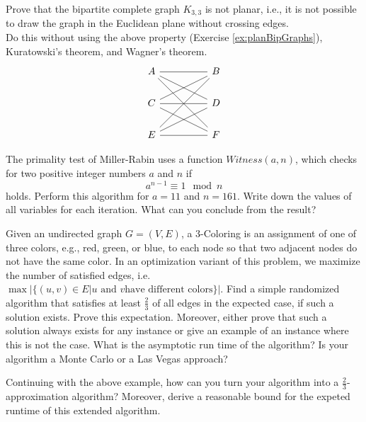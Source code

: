 \documentclass{article}
\begin{document}
\begin{exercise}
    Prove that the bipartite complete graph $K_{3,3}$ is not planar, i.e., it is not possible to draw the graph in the Euclidean plane without crossing edges.\\
    Do this without using the above property (Exercise \ref{ex:planBipGraphs}), Kuratowski's theorem, and Wagner's theorem.
    \[\begin{tikzcd}
	A && B \\
	C && D \\
	E && F
	\arrow[no head, from=1-1, to=1-3]
	\arrow[no head, from=2-3, to=1-1]
	\arrow[no head, from=1-1, to=3-3]
	\arrow[no head, from=1-3, to=2-1]
	\arrow[no head, from=1-3, to=3-1]
	\arrow[no head, from=2-1, to=2-3]
	\arrow[no head, from=3-1, to=3-3]
	\arrow[no head, from=2-1, to=3-3]
	\arrow[no head, from=2-3, to=3-1]
\end{tikzcd}\]
\end{exercise}
\begin{solving}
    
\end{solving}

\newpage
\begin{exercise}
    The primality test of Miller-Rabin uses a function $Witness(a,n)$, which checks for two positive integer numbers $a$ and $n$ if 
    \begin{equation*}
        a^{n-1} \equiv 1 \mod n
    \end{equation*}
    holds. Perform this algorithm for $a = 11$ and $n = 161$. Write down the values of all variables for each iteration. What can you conclude from the result?
\end{exercise}

\begin{exercise}
    Given an undirected graph $G= (V,E)$, a $3$-Coloring is an assignment of one of three colors, e.g., red, green, or blue, to each node so that two adjacent nodes do not have the same color. In an optimization variant of this problem, we maximize the number of satisfied edges, i.e. $\max|\{(u,v)\in E| u \text{ and } v \text{have different colors}\}|$. Find a simple randomized algorithm that satisfies at least $\frac23$ of all edges in the expected case, if such a solution exists. Prove this expectation. Moreover, either prove that such a solution always exists for any instance or give an example of an instance where this is not the case. What is the asymptotic run time of the algorithm? Is your algorithm a Monte Carlo or a Las Vegas approach?
\end{exercise}

\begin{exercise}
    Continuing with the above example, how can you turn your algorithm into a $\frac23$-approximation algorithm? Moreover, derive a reasonable bound for the expeted runtime of this extended algorithm.
\end{exercise}
\end{document}
